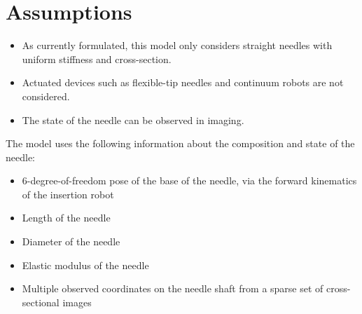 \section{Assumptions}
\begin{itemize}
\item As currently formulated, this model only considers straight needles with uniform stiffness and cross-section.

\item Actuated devices such as flexible-tip needles and continuum robots are not considered.

\item The state of the needle can be observed in imaging.

\end{itemize}

The model uses the following information about the composition and state of the needle:
\begin{itemize}
\item 6-degree-of-freedom pose of the base of the needle, via the forward kinematics of the insertion robot
\item Length of the needle
\item Diameter of the needle
\item Elastic modulus of the needle
\item Multiple observed coordinates on the needle shaft from a sparse set of cross-sectional images
\end{itemize}

